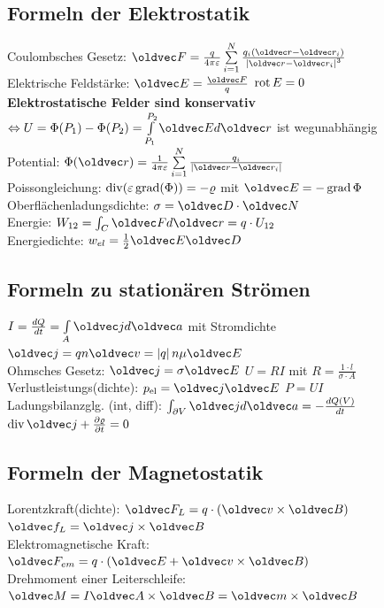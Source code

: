 \documentclass[6pt,a4paper]{scrartcl}
\let\vec\oldvec
\begin{document}
\begin{multicols}{4}
\subsection{Formeln der Elektrostatik}
Coulombsches Gesetz: $\vec F = \frac{q}{4 \pi \varepsilon} \sum \limits_{i = 1}^N\frac{q_i (\vec r - \vec r_i )}{\abs{\vec r - \vec r_i}^3}$ \\
Elektrische Feldstärke: $\vec E = \frac{\vec F}{q} $ \quad $\operatorname{rot} E = 0$ \\
\textbf{Elektrostatische Felder sind konservativ} $\Leftrightarrow U = \Phi(P_1) - \Phi(P_2) = \int \limits_{P_1}^{P_2} \vec E d \vec r$ ist wegunabhängig \\
Potential: $\Phi (\vec r) = \frac{1}{4 \pi \varepsilon} \sum \limits_{i =1}^{N} \frac{q_i}{\abs{\vec r - \vec r_i}}$ \\
Poissongleichung: $\operatorname{div}(\varepsilon \operatorname{grad}(\Phi)) = - \varrho$ mit $\vec E = -\grad \Phi$ \\
Oberflächenladungsdichte: $\sigma = \vec D \cdot \vec N$ \\
Energie: $W_{12} = \int_C \vec F d \vec r = q \cdot U_{12}$ \\
Energiedichte: $w_{el} = \frac{1}{2} \vec E \vec D$ \\

\subsection{Formeln zu stationären Strömen}
$I = \frac{d Q}{d t} = \int \limits_A \vec j d \vec a$ mit Stromdichte $\vec j = qn\vec v = \abs{q}n\mu \vec E$ \\
Ohmsches Gesetz: $\vec j = \sigma\vec E$ \quad $U = R I$ mit $R = \frac{1 \cdot l}{\sigma\cdot A}$ \\
Verlustleistungs(dichte): $p_{\text{el}} = \vec j \vec E$ \quad $P = UI$ \\
Ladungsbilanzglg. (int, diff): $\int_{\partial V} \vec j d \vec a  = - \frac{d Q(V)}{dt}$ \quad $\div \vec j + \frac{\partial \varrho}{\partial t} = 0$

\subsection{Formeln der Magnetostatik}
Lorentzkraft(dichte): $\vec F_L = q \cdot (\vec v \times \vec B)$ \quad $\vec f_L = \vec j \times \vec B$\\
Elektromagnetische Kraft: $\vec F_{em} = q\cdot(\vec E + \vec v \times \vec B)$\\
Drehmoment einer Leiterschleife: $\vec M = I\vec A \times \vec B = \vec m \times \vec B$


\end{multicols}
\end{document}
